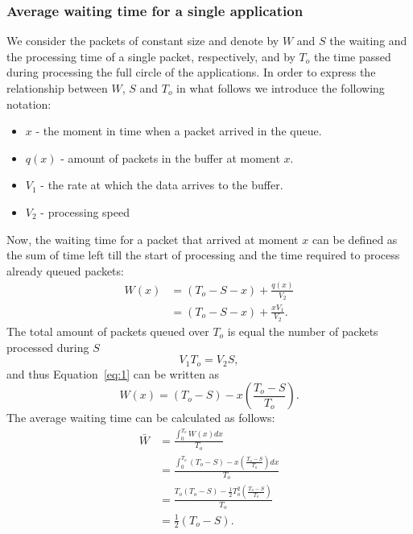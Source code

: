 \documentclass[english]{kththesis}
\begin{document}
\subsubsection{Average waiting time for a single application}
We consider the packets of constant size and denote by \(W\) and \(S\) the waiting and the processing time of a single packet, respectively, and by \(T_o\) the time passed during processing the full circle of the applications. In order to express the relationship between \(W\), \(S\) and \(T_o\) in what follows we introduce the following notation:
\begin{itemize}
    \item \(x\) - the moment in time when a packet arrived in the queue.
    \item \(q(x)\) - amount of packets in the buffer at moment \(x\).
    \item \(V_1\) - the rate at which the data arrives to the buffer.
    \item \(V_2\) - processing speed
\end{itemize}
Now, the waiting time for a packet that arrived at moment \(x\) can be defined as the sum of time left till the start of processing and the time required to process already queued packets:
\begin{equation}
\label{eq:1}
\begin{split}
W(x) & = (T_o - S - x) + \frac{q(x)}{V_2} \\
       & = (T_o - S - x) + \frac{xV_1}{V_2}.
\end{split}
\end{equation}
The total amount of packets queued over \(T_o\) is equal the number of packets processed during \(S\)
\begin{equation}
\label{eq:2}
V_1 T_o = V_2 S,
\end{equation}
and thus Equation~\ref{eq:1} can be written as
\begin{equation}
\label{eq:3}
W(x) = (T_o - S) - x\left(\frac{T_o - S}{T_o}\right).
\end{equation}
The average waiting time can be calculated as follows:
\begin{equation}
\label{eq:4}
\begin{split}
\bar{W} & = \frac{\int^{T_o}_{0} W(x) dx}{T_o}\\
       & = \frac{\int^{T_o}_{0} (T_o - S) - x\left(\frac{T_o - S}{T_o}\right) dx}{T_o} \\
       & = \frac{T_o (T_o - S) - \frac{1}{2} T_o^2 \left(\frac{T_o - S}{T_o}\right)}{T_o} \\
       & = \frac{1}{2} (T_o - S).
\end{split}
\end{equation}
\end{document}
